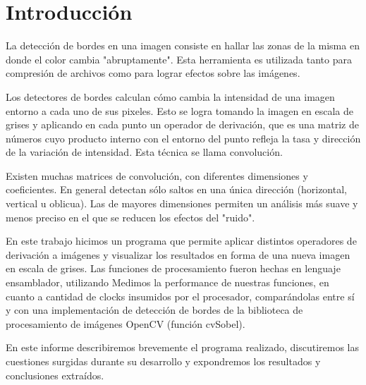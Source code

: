 %

\section{Introducción}

La detección de bordes en una imagen consiste en hallar las zonas de la misma en donde el color cambia "abruptamente". Esta herramienta es utilizada tanto para compresión de archivos como para lograr efectos sobre las imágenes.

Los detectores de bordes calculan cómo cambia la intensidad de una imagen entorno a cada uno de sus pixeles. Esto se logra tomando la imagen en escala de grises y aplicando en cada punto un operador de derivación, que es una matriz de números cuyo producto interno con el entorno del punto refleja la tasa y dirección de la variación de intensidad. Esta técnica se llama convolución.

Existen muchas matrices de convolución, con diferentes dimensiones y coeficientes. En general detectan sólo saltos en una única dirección (horizontal, vertical u oblicua). Las de mayores dimensiones permiten un análisis más suave y menos preciso en el que se reducen los efectos del "ruido".

En este trabajo hicimos un programa que permite aplicar distintos operadores de derivación a imágenes y visualizar los resultados en forma de una nueva imagen en escala de grises. Las funciones de procesamiento fueron hechas en lenguaje ensamblador, utilizando %
Medimos la performance de nuestras funciones, en cuanto a cantidad de clocks insumidos por el procesador, comparándolas entre sí y con una implementación de detección de bordes de la biblioteca de procesamiento de imágenes OpenCV (función cvSobel).

En este informe describiremos brevemente el programa realizado, discutiremos las cuestiones surgidas durante su desarrollo y expondremos los resultados y conclusiones extraídos.
